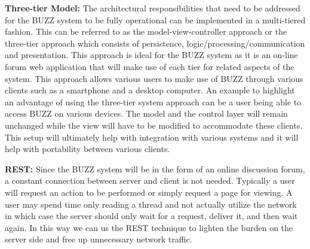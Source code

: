 \begin{flushleft}
\textbf{Three-tier Model:}
The architectural responsibilities that need to be addressed for the BUZZ system to be fully operational can be implemented in a multi-tiered fashion. This can be referred to as the model-view-controller approach or the three-tier approach which consists of persistence, logic/processing/communication and presentation. This approach is ideal for the BUZZ system as it is an on-line forum web application that will make use of each tier for related aspects of the system. This approach allows various users to make use of BUZZ through various clients such as a smartphone and a desktop computer. An example to highlight an advantage of using the three-tier system approach can be a user being able to access BUZZ on various devices. The model and the control layer will remain unchanged while the view will have to be modified to accommodate these clients.  This setup will ultimately help with integration with various systems and it will help with portability between various clients.
\end{flushleft}

\begin{flushleft}
\textbf{REST:}
 Since the BUZZ system will be in the form of an online discussion forum, a constant connection between server and client is not needed. Typically a user will request an action to be performed or simply request a page for viewing. A user may spend time only reading a thread and not actually utilize the network in which case the server should only wait for a request, deliver it, and then wait again. In this way we can us the REST technique to lighten the burden on the server side and free up unnecessary network traffic.
\end{flushleft}
